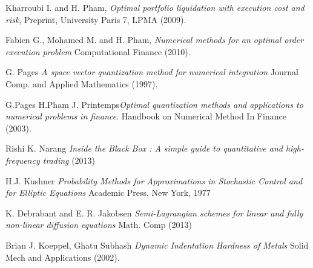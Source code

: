 \documentclass[a4paper,10pt]{article}
\begin{document}
\begin{thebibliography}{9}
 Kharroubi I. and H. Pham, {\it Optimal portfolio liquidation with execution cost and risk}, Preprint, University Paris 7, LPMA (2009).

 Fabien G., Mohamed M. and H. Pham, {\it Numerical methods for an optimal order execution problem} Computational Finance (2010).

 G. Pages {\it A space vector quantization method for numerical integration} Journal Comp. and Applied Mathematics (1997).

 G.Pages H.Pham J. Printemps{\it Optimal quantization methods and applications to numerical problems in finance}. Handbook on Numerical Method In Finance (2003).

 Rishi K. Narang {\it Inside the Black Box : A simple guide to quantitative and high-frequency trading} (2013)

 H.J. Kushner {\it Probability Methods for Approximations in Stochastic Control and for Elliptic Equations} Academic Press, New York, 1977

 K. Debrabant and E. R. Jakobsen {\it Semi-Lagrangian schemes for linear and fully non-linear diffusion equations} Math. Comp (2013)

 Brian J. Koeppel, Ghatu Subhash {\it Dynamic Indentation Hardness of Metals} Solid Mech and Applications (2002). 

\end{thebibliography}

%
\end{document}
